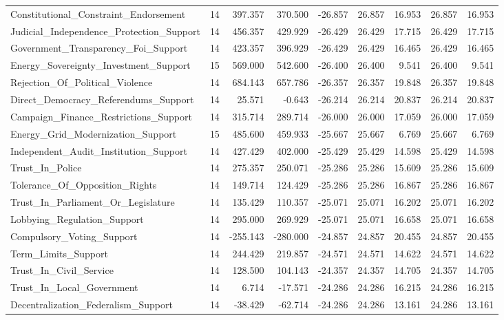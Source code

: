 \begin{table}[htbp]
\begin{threeparttable}
\begin{adjustbox}{max width=\linewidth}
\begin{tabular}{lrrrrrrrr}
Constitutional\_Constraint\_Endorsement & 14 & 397.357 & 370.500 & -26.857 & 26.857 & 16.953 & 26.857 & 16.953 \\
Judicial\_Independence\_Protection\_Support & 14 & 456.357 & 429.929 & -26.429 & 26.429 & 17.715 & 26.429 & 17.715 \\
Government\_Transparency\_Foi\_Support & 14 & 423.357 & 396.929 & -26.429 & 26.429 & 16.465 & 26.429 & 16.465 \\
Energy\_Sovereignty\_Investment\_Support & 15 & 569.000 & 542.600 & -26.400 & 26.400 & 9.541 & 26.400 & 9.541 \\
Rejection\_Of\_Political\_Violence & 14 & 684.143 & 657.786 & -26.357 & 26.357 & 19.848 & 26.357 & 19.848 \\
Direct\_Democracy\_Referendums\_Support & 14 & 25.571 & -0.643 & -26.214 & 26.214 & 20.837 & 26.214 & 20.837 \\
Campaign\_Finance\_Restrictions\_Support & 14 & 315.714 & 289.714 & -26.000 & 26.000 & 17.059 & 26.000 & 17.059 \\
Energy\_Grid\_Modernization\_Support & 15 & 485.600 & 459.933 & -25.667 & 25.667 & 6.769 & 25.667 & 6.769 \\
Independent\_Audit\_Institution\_Support & 14 & 427.429 & 402.000 & -25.429 & 25.429 & 14.598 & 25.429 & 14.598 \\
Trust\_In\_Police & 14 & 275.357 & 250.071 & -25.286 & 25.286 & 15.609 & 25.286 & 15.609 \\
Tolerance\_Of\_Opposition\_Rights & 14 & 149.714 & 124.429 & -25.286 & 25.286 & 16.867 & 25.286 & 16.867 \\
Trust\_In\_Parliament\_Or\_Legislature & 14 & 135.429 & 110.357 & -25.071 & 25.071 & 16.202 & 25.071 & 16.202 \\
Lobbying\_Regulation\_Support & 14 & 295.000 & 269.929 & -25.071 & 25.071 & 16.658 & 25.071 & 16.658 \\
Compulsory\_Voting\_Support & 14 & -255.143 & -280.000 & -24.857 & 24.857 & 20.455 & 24.857 & 20.455 \\
Term\_Limits\_Support & 14 & 244.429 & 219.857 & -24.571 & 24.571 & 14.622 & 24.571 & 14.622 \\
Trust\_In\_Civil\_Service & 14 & 128.500 & 104.143 & -24.357 & 24.357 & 14.705 & 24.357 & 14.705 \\
Trust\_In\_Local\_Government & 14 & 6.714 & -17.571 & -24.286 & 24.286 & 16.215 & 24.286 & 16.215 \\
Decentralization\_Federalism\_Support & 14 & -38.429 & -62.714 & -24.286 & 24.286 & 13.161 & 24.286 & 13.161 \\

\end{tabular}
\end{adjustbox}
\end{threeparttable}
\end{table}
